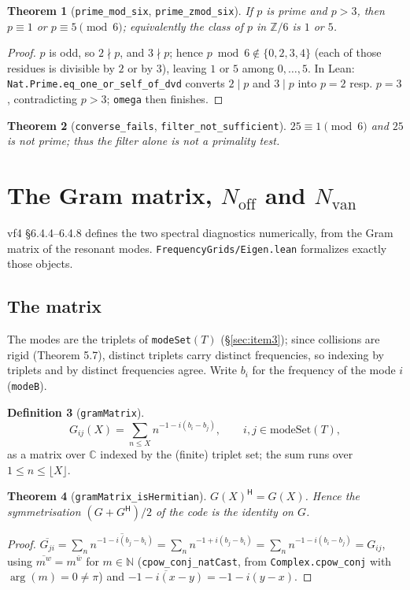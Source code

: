 \documentclass[11pt,a4paper]{article}
\newcommand{\N}{\mathbb{N}}
\newcommand{\Z}{\mathbb{Z}}
\newcommand{\C}{\mathbb{C}}
\newcommand{\lb}{\_\allowbreak}
\newcommand{\code}[1]{\texttt{#1}}
\newtheorem{theorem}{Theorem}[section]
\theoremstyle{definition}
\newtheorem{definition}[theorem]{Definition}
\theoremstyle{remark}
\begin{document}
\begin{theorem}[\code{prime\lb mod\lb six}, \code{prime\lb zmod\lb six}]
If $p$ is prime and $p>3$, then $p\equiv1$ or $p\equiv5\pmod 6$; equivalently the class of
$p$ in $\Z/6$ is $1$ or $5$.
\end{theorem}
\begin{proof}
$p$ is odd, so $2\nmid p$, and $3\nmid p$; hence $p\bmod6\notin\{0,2,3,4\}$ (each of those
residues is divisible by $2$ or by $3$), leaving $1$ or $5$ among $0,\dots,5$.  In Lean:
\code{Nat.Prime.eq\lb one\lb or\lb self\lb of\lb dvd} converts $2\mid p$ and $3\mid p$ into
$p=2$ resp. $p=3$, contradicting $p>3$; \code{omega} then finishes.
\end{proof}

\begin{theorem}[\code{converse\lb fails}, \code{filter\lb not\lb sufficient}]
$25\equiv1\pmod6$ and $25$ is not prime; thus the filter alone is not a primality test.
\end{theorem}


\section{The Gram matrix, $N_{\mathrm{off}}$ and $N_{\mathrm{van}}$}\label{sec:eigen}

vf4 \S6.4.4--6.4.8 defines the two spectral diagnostics numerically, from the Gram matrix of
the resonant modes.  \code{FrequencyGrids/Eigen.lean} formalizes exactly those objects.

\subsection*{The matrix}

The modes are the triplets of \code{modeSet}$(T)$ (\S\ref{sec:item3}); since collisions are
rigid (Theorem 5.7), distinct triplets carry distinct frequencies, so indexing by triplets
and by distinct frequencies agree.  Write $b_i$ for the frequency of the mode $i$
(\code{modeB}).

\begin{definition}[\code{gramMatrix}]
\[
  G_{ij}(X)=\sum_{n\le X} n^{-1-i(b_i-b_j)},\qquad i,j\in\mathrm{modeSet}(T),
\]
as a matrix over $\C$ indexed by the (finite) triplet set; the sum runs over
$1\le n\le\lfloor X\rfloor$.
\end{definition}

\begin{theorem}[\code{gramMatrix\lb isHermitian}]\label{thm:herm}
$G(X)^{\mathsf H}=G(X)$.  Hence the symmetrisation $(G+G^{\mathsf H})/2$ of the code is the
identity on $G$.
\end{theorem}
\begin{proof}
$\overline{G_{ji}}=\sum_n\overline{n^{-1-i(b_j-b_i)}}=\sum_n n^{-1+i(b_j-b_i)}
=\sum_n n^{-1-i(b_i-b_j)}=G_{ij}$, using $\overline{m^{w}}=m^{\bar w}$ for $m\in\N$
(\code{cpow\lb conj\lb natCast}, from \code{Complex.cpow\lb conj} with
$\arg(m)=0\ne\pi$) and $\overline{-1-i(x-y)}=-1-i(y-x)$.
\end{proof}
\end{document}

